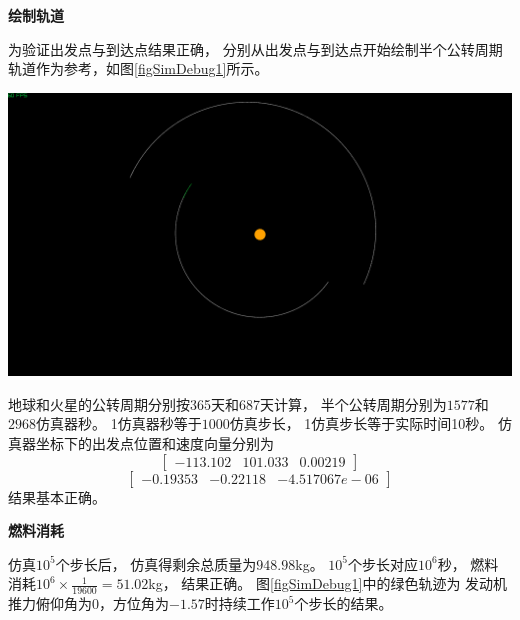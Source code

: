 \noindent\textbf{绘制轨道}\par
为验证出发点与到达点结果正确，
分别从出发点与到达点开始绘制半个公转周期轨道作为参考，如图\ref{figSimDebug1}所示。
\begin{center}
	\includegraphics[scale=0.2]{simdebug1.png}  \\
	\label{figSimDebug1}
\end{center}
地球和火星的公转周期分别按365天和687天计算，
半个公转周期分别为$1577$和$2968$仿真器秒。
1仿真器秒等于$1000$仿真步长，
1仿真步长等于实际时间10秒。
仿真器坐标下的出发点位置和速度向量分别为
\[[\begin{matrix}
    -113.102 & 101.033 & 0.00219
\end{matrix}]\]
\[[\begin{matrix}
    -0.19353 & -0.22118 & -4.517067e-06
\end{matrix}]\]
结果基本正确。

\noindent\textbf{燃料消耗}\par
仿真$10^5$个步长后，
仿真得剩余总质量为$948.98$kg。
$10^5$个步长对应$10^6$秒，
燃料消耗$10^6\times\frac{1}{19600}=51.02$kg，
结果正确。
图\ref{figSimDebug1}中的绿色轨迹为
发动机推力俯仰角为0，方位角为$-1.57$时持续工作$10^5$个步长的结果。
